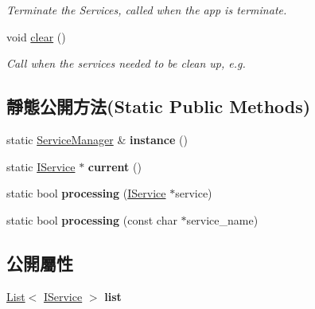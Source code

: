\begin{DoxyCompactItemize}
\begin{DoxyCompactList}\small\item\em Terminate the Services, called when the app is terminate. \end{DoxyCompactList}\item 
void \hyperlink{class_magnum_1_1_service_manager_ab131108aa3b4270651541f65e7b3d7cb}{clear} ()
\begin{DoxyCompactList}\small\item\em Call when the services needed to be clean up, e.\+g. \end{DoxyCompactList}\end{DoxyCompactItemize}
\subsection*{靜態公開方法(Static Public Methods)}
\begin{DoxyCompactItemize}
\item 
static \hyperlink{class_magnum_1_1_service_manager}{Service\+Manager} \& {\bfseries instance} ()\hypertarget{class_magnum_1_1_service_manager_ad78e686a5fcf0c9a345fa67fd5128009}{}\label{class_magnum_1_1_service_manager_ad78e686a5fcf0c9a345fa67fd5128009}

\item 
static \hyperlink{class_magnum_1_1_i_service}{I\+Service} $\ast$ {\bfseries current} ()\hypertarget{class_magnum_1_1_service_manager_aa5e45ba30047395746a187172354c814}{}\label{class_magnum_1_1_service_manager_aa5e45ba30047395746a187172354c814}

\item 
static bool {\bfseries processing} (\hyperlink{class_magnum_1_1_i_service}{I\+Service} $\ast$service)\hypertarget{class_magnum_1_1_service_manager_ad109bb2cfd46435c4bc3642c7bf39247}{}\label{class_magnum_1_1_service_manager_ad109bb2cfd46435c4bc3642c7bf39247}

\item 
static bool {\bfseries processing} (const char $\ast$service\+\_\+name)\hypertarget{class_magnum_1_1_service_manager_a58315c8fd270bc63e2c7f7c432012c2a}{}\label{class_magnum_1_1_service_manager_a58315c8fd270bc63e2c7f7c432012c2a}

\end{DoxyCompactItemize}
\subsection*{公開屬性}
\begin{DoxyCompactItemize}
\item 
\hyperlink{class_magnum_1_1_list}{List}$<$ \hyperlink{class_magnum_1_1_i_service}{I\+Service} $>$ {\bfseries list}\hypertarget{class_magnum_1_1_service_manager_a98f26fc67a796ba874c394447bf76d66}{}\label{class_magnum_1_1_service_manager_a98f26fc67a796ba874c394447bf76d66}

\end{DoxyCompactItemize}


